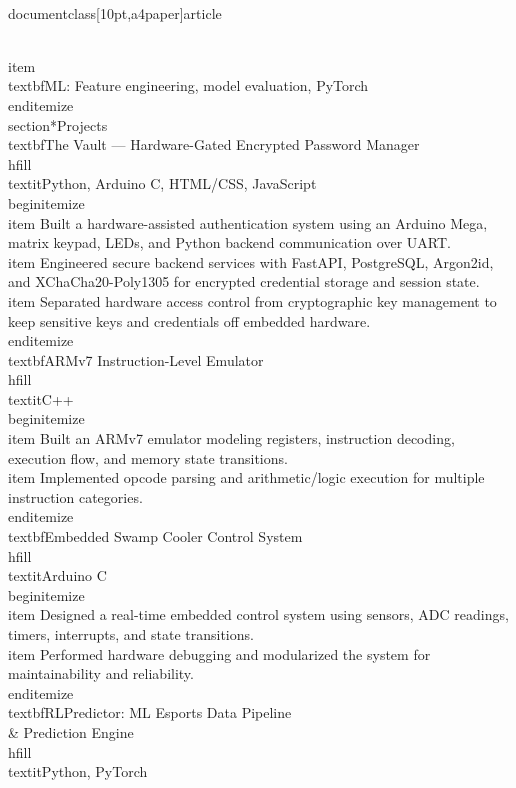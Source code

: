 \\documentclass[10pt,a4paper]{article}
\begin{document}
    \\item \\textbf{ML:} Feature engineering, model evaluation, PyTorch
\\end{itemize}
\\section*{Projects}
\\textbf{The Vault --- Hardware-Gated Encrypted Password Manager} \\hfill \\textit{Python, Arduino C, HTML/CSS, JavaScript}
\\begin{itemize}
    \\item Built a hardware-assisted authentication system using an Arduino Mega, matrix keypad, LEDs, and Python backend communication over UART.
    \\item Engineered secure backend services with FastAPI, PostgreSQL, Argon2id, and XChaCha20-Poly1305 for encrypted credential storage and session state.
    \\item Separated hardware access control from cryptographic key management to keep sensitive keys and credentials off embedded hardware.
\\end{itemize}
\\textbf{ARMv7 Instruction-Level Emulator} \\hfill \\textit{C++}
\\begin{itemize}
    \\item Built an ARMv7 emulator modeling registers, instruction decoding, execution flow, and memory state transitions.
    \\item Implemented opcode parsing and arithmetic/logic execution for multiple instruction categories.
\\end{itemize}
\\textbf{Embedded Swamp Cooler Control System} \\hfill \\textit{Arduino C}
\\begin{itemize}
    \\item Designed a real-time embedded control system using sensors, ADC readings, timers, interrupts, and state transitions.
    \\item Performed hardware debugging and modularized the system for maintainability and reliability.
\\end{itemize}
\\textbf{RLPredictor: ML Esports Data Pipeline \\& Prediction Engine} \\hfill \\textit{Python, PyTorch}
\end{document}
